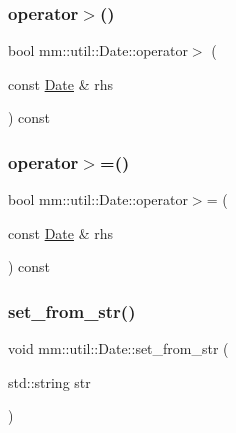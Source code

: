 \mbox{\label{structmm_1_1util_1_1_date_a5b070fd2cd4a72cf74849abd9244b6d3}} 
\subsubsection{\texorpdfstring{operator$>$()}{operator>()}}
{\footnotesize\ttfamily bool mm\+::util\+::\+Date\+::operator$>$ (\begin{DoxyParamCaption}\item[{const \mbox{\hyperlink{structmm_1_1util_1_1_date}{Date}} \&}]{rhs }\end{DoxyParamCaption}) const}

\mbox{\label{structmm_1_1util_1_1_date_ab0dc9872f7646c748d492afcff696a0d}} 
\subsubsection{\texorpdfstring{operator$>$=()}{operator>=()}}
{\footnotesize\ttfamily bool mm\+::util\+::\+Date\+::operator$>$= (\begin{DoxyParamCaption}\item[{const \mbox{\hyperlink{structmm_1_1util_1_1_date}{Date}} \&}]{rhs }\end{DoxyParamCaption}) const}

\mbox{\label{structmm_1_1util_1_1_date_a9140b9c53f02f7385af15684c81c5ed0}} 
\subsubsection{\texorpdfstring{set\+\_\+from\+\_\+str()}{set\_from\_str()}}
{\footnotesize\ttfamily void mm\+::util\+::\+Date\+::set\+\_\+from\+\_\+str (\begin{DoxyParamCaption}\item[{std\+::string}]{str }\end{DoxyParamCaption})}



